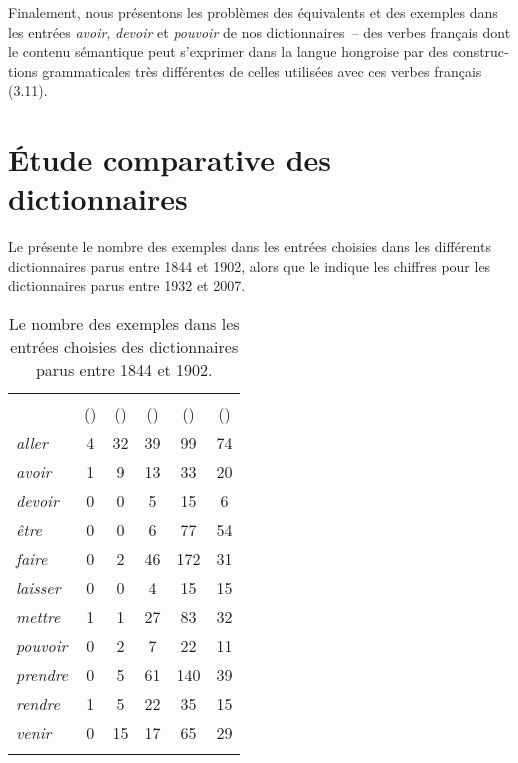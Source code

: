 \documentclass[output=paper,colorlinks,citecolor=brown,arabicfont,chinesefont,booklanguage=french]{langscibook}
\begin{document}
\begin{otherlanguage}{french}
Finalement, nous présentons les problèmes des équivalents et des exemples dans les entrées \emph{avoir}, \emph{devoir} et \emph{pouvoir} de nos dictionnaires~-- des verbes français dont le contenu sémantique peut s’exprimer dans la langue hongroise par des constructions grammaticales très différentes de celles utilisées avec ces verbes français (3.11).

\section{Étude comparative des dictionnaires}\label{sec:tillinger:3}

Le  présente le nombre des exemples dans les entrées choisies dans les différents dictionnaires parus entre 1844 et 1902, alors que le  indique les chiffres pour les dictionnaires parus entre 1932 et 2007.

\begin{table}[p]
\small
\caption{Le nombre des exemples dans les entrées choisies des dictionnaires parus entre 1844 et 1902.}
\label{til:tab1}
\begin{tabular}{>{\itshape}l *5{c}}
\lsptoprule
 & \citeauthor{Kiss1844} & \citeauthor{Babos1865} & \citeauthor{Martonffy1879} & \citeauthor{Pokorny1880} & \citeauthor{Theisz1902} \\
 & (\citeyear{Kiss1844}) & (\citeyear{Babos1865}) & (\citeyear{Martonffy1879}) & (\citeyear{Pokorny1880}) & (\citeyear{Theisz1902}) \\
\midrule
aller & 4 & 32 & 39 & 99 & 74 \\
avoir & 1 & 9 & 13 & 33 & 20 \\
devoir & 0 & 0 & 5 & 15 & 6 \\
être & 0 & 0 & 6 & 77 & 54 \\
faire & 0 & 2 & 46 & 172 & 31 \\
laisser & 0 & 0 & 4 & 15 & 15 \\
mettre & 1 & 1 & 27 & 83 & 32 \\
pouvoir & 0 & 2 & 7 & 22 & 11 \\
prendre & 0 & 5 & 61 & 140 & 39 \\
rendre & 1 & 5 & 22 & 35 & 15 \\
venir & 0 & 15 & 17 & 65 & 29 \\
\lspbottomrule
\end{tabular}
\end{table}


\end{otherlanguage}
\end{document}
